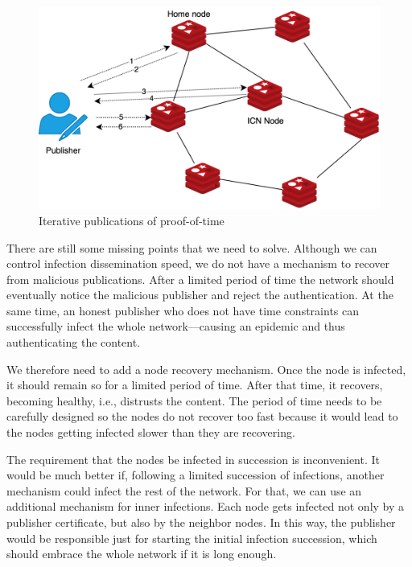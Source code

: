 \begin{figure}[h!]
    \centering
    \includegraphics[width=\linewidth]{img/iterative-publications.png}
    \caption{Iterative publications of proof-of-time}
    \label{fig:iterative-publications}
\end{figure}

There are still some missing points that we need to solve. Although we can control infection dissemination speed, we do not have a mechanism to recover from malicious publications.  After a limited period of time the network should eventually notice the malicious publisher and reject the authentication. At the same time, an honest publisher who does not have time constraints can successfully infect the whole network––causing an epidemic and thus authenticating the content. 

We therefore need to add a node recovery mechanism. Once the node is infected, it should remain so for a limited period of time. After that time, it recovers, becoming healthy, i.e., distrusts the content. The period of time needs to be carefully designed so the nodes do not recover too fast because it would lead to the nodes getting infected slower than they are recovering. 

The requirement that the nodes be infected in succession is inconvenient. It would be much better if, following a limited succession of infections, another mechanism could infect the rest of the network.
For that, we can use an additional mechanism for inner infections. Each node gets infected not only by a publisher certificate, but also by the neighbor nodes. In this way, the publisher would be responsible just for starting the initial infection succession, which should embrace the whole network if it is long enough. 